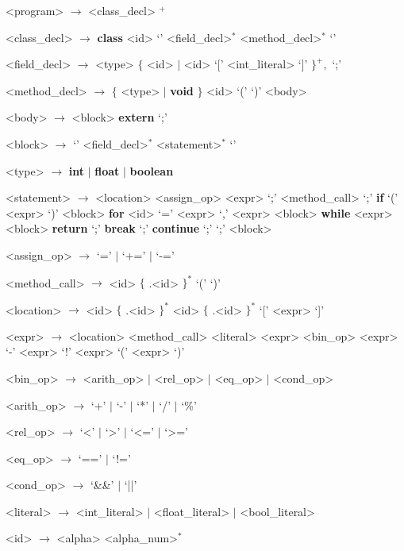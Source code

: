 \documentclass[11pt,a4paper]{article}
\begin{document}
\begin{grammar}
<program> $\rightarrow$ <class_decl> $^{+}$

<class_decl> $\rightarrow$ \textbf{class} <id> `{' <field_decl>$^{*}$ <method_decl>$^{*}$ `}'

<field_decl> $\rightarrow$ <type> $\lbrace$ <id> $\mid$ <id> `[' <int_literal> `]' $\rbrace ^{+} ,$ `;'

<method_decl> $\rightarrow$ $\lbrace$ <type> $\mid$ \textbf{void} $\rbrace$ <id> `('  `)' <body>

<body> $\rightarrow$ <block>
\alt \textbf{extern} `;'

<block> $\rightarrow$ `{'  <field_decl>$^{*}$ <statement>$^{*}$ `}'

<type> $\rightarrow$ \textbf{int} $\mid$ \textbf{float} $\mid$ \textbf{boolean}
 
<statement> $\rightarrow$ <location> <assign_op> <expr> `;'
\alt <method_call> `;'
\alt \textbf{if} `(' <expr> `)' <block> 
\alt \textbf{for} <id> `=' <expr> `,' <expr> <block> 
\alt \textbf{while} <expr> <block> 
\alt \textbf{return}  `;'
\alt \textbf{break} `;'
\alt \textbf{continue} `;'
\alt `;'
\alt <block> 

<assign_op> $\rightarrow$ `=' $\mid$ `+=' $\mid$ `-='

<method_call> $\rightarrow$ <id> $\lbrace$ .<id> $\rbrace ^{*}$ `('  `)'

<location> $\rightarrow$ <id> $\lbrace$ .<id> $\rbrace ^{*}$ 
\alt <id> $\lbrace$ .<id> $\rbrace ^{*}$ `[' <expr> `]'

<expr> $\rightarrow$ <location>
\alt <method_call>
\alt <literal>
\alt <expr> <bin_op> <expr>
\alt `-' <expr>
\alt `!' <expr>
\alt `(' <expr> `)'

<bin_op> $\rightarrow$ <arith_op> $\mid$ <rel_op> $\mid$ <eq_op> $\mid$ <cond_op>

<arith_op> $\rightarrow$ `+' $\mid$ `-' $\mid$ `*' $\mid$ `/' $\mid$ `\%'

<rel_op> $\rightarrow$ `<' $\mid$ `>' $\mid$ `<=' $\mid$ `>='

<eq_op> $\rightarrow$ `==' $\mid$ `!='

<cond_op> $\rightarrow$ `&&' $\mid$ `||'

<literal> $\rightarrow$ <int_literal> $\mid$ <float_literal> $\mid$ <bool_literal>

<id> $\rightarrow$ <alpha> <alpha_num>$^{*}$


\end{grammar}
\end{document}
